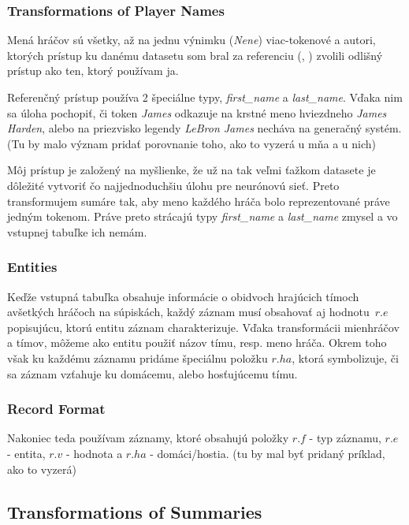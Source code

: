 \subsubsection{Transformations of Player Names} \label{trans_p_nms}

Mená hráčov sú všetky, až na jednu výnimku (\emph{Nene}) viac-tokenové a autori, ktorých prístup ku danému datasetu som bral za referenciu (\citep{wiseman2017}, \citep{puduppully2019datatotext}) zvolili odlišný prístup ako ten, ktorý používam ja.

Referenčný prístup používa 2 špeciálne typy, \emph{first\_name} a \emph{last\_name}. Vďaka nim sa úloha pochopiť, či token \emph{James} odkazuje na krstné meno hviezdneho \emph{James Harden}, alebo na priezvisko legendy \emph{LeBron James} necháva na generačný systém. (Tu by malo význam pridať porovnanie toho, ako to vyzerá u mňa a u nich)

Môj prístup je založený na myšlienke, že už na tak veľmi ťažkom datasete je dôležité vytvoriť čo najjednoduchšiu úlohu pre neurónovú sieť. Preto transformujem sumáre tak, aby meno každého hráča bolo reprezentované práve jedným tokenom. Práve preto strácajú typy \emph{first\_name} a \emph{last\_name} zmysel a vo vstupnej tabuľke ich nemám.

\subsubsection{Entities}

Keďže vstupná tabuľka obsahuje informácie o obidvoch hrajúcich tímoch a\linebreak[4]všetkých hráčoch na súpiskách, každý záznam musí obsahovať aj hodnotu~$r.e$ popisujúcu, ktorú entitu záznam charakterizuje. Vďaka transformácii mien\linebreak[4]hráčov a tímov, môžeme ako entitu použiť názov tímu, resp. meno hráča. Okrem toho však ku každému záznamu pridáme špeciálnu položku $r.ha$, ktorá symbolizuje, či sa záznam vzťahuje ku domácemu, alebo hosťujúcemu tímu. 

\subsubsection{Record Format}

Nakoniec teda používam záznamy, ktoré obsahujú položky $r.f$ - typ záznamu, $r.e$ - entita, $r.v$ - hodnota a $r.ha$ - domáci/hostia. (tu by mal byť pridaný príklad, ako to vyzerá)

\subsection{Transformations of Summaries}

